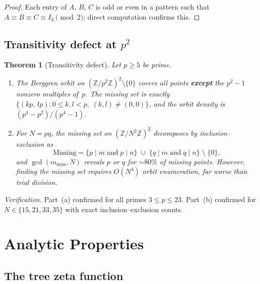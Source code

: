 \documentclass[12pt]{amsart}
\newtheorem{theorem}{Theorem}[section]
\theoremstyle{definition}
\theoremstyle{remark}
\begin{document}
\begin{proof}
Each entry of $A$, $B$, $C$ is odd or even in a pattern such that
$A\equiv B\equiv C\equiv I_{3}\pmod{2}$; direct computation confirms this.
\end{proof}

\subsection{Transitivity defect at \texorpdfstring{$p^{2}$}{p squared}}

\begin{theorem}[Transitivity defect]\label{thm:transit-defect}
Let $p\ge5$ be prime.
\begin{enumerate}[label=(\alph*)]
  \item The Berggren orbit on $(\mathbb{Z}/p^{2}\mathbb{Z})^{2}\setminus\{0\}$
    covers all points \textbf{except} the $p^{2}-1$ nonzero multiples of~$p$.
    The missing set is exactly
    $\{(kp,\,lp):0\le k,l<p,\;(k,l)\neq(0,0)\}$,
    and the orbit density is $(p^{4}-p^{2})/(p^{4}-1)$.
  \item For $N=pq$, the missing set on $(\mathbb{Z}/N^{2}\mathbb{Z})^{2}$
    decomposes by inclusion--exclusion as
    \[
      \mathrm{Missing}=\{p\mid m\;\text{and}\;p\mid n\}
        \;\cup\;\{q\mid m\;\text{and}\;q\mid n\}
        \;\setminus\;\{0\},
    \]
    and $\gcd(m_{\mathrm{miss}},N)$ reveals $p$ or $q$ for $\sim80\%$ of missing
    points.  However, \emph{finding} the missing set requires $O(N^{4})$ orbit
    enumeration, far worse than trial division.
\end{enumerate}
\end{theorem}

\noindent
\textit{Verification.}  Part~(a) confirmed for all primes $3\le p\le23$.
Part~(b) confirmed for $N\in\{15,21,33,35\}$ with exact inclusion--exclusion counts.


\section{Analytic Properties}\label{sec:analytic}

\subsection{The tree zeta function}
\end{document}
